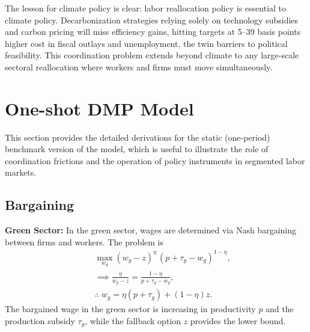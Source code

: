 \documentclass[preprint,12pt]{elsarticle}
\begin{document}
The lesson for climate policy is clear: labor reallocation policy is essential to climate policy. Decarbonization strategies relying solely on technology subsidies and carbon pricing will miss efficiency gains, hitting targets at 5–39 basis points higher cost in fiscal outlays and unemployment, the twin barriers to political feasibility.  This coordination problem extends beyond climate to any large-scale sectoral reallocation where workers and firms must move simultaneously.



\newpage


 

\newpage

\appendix
\renewcommand{\theequation}{A.\arabic{equation}}

\setcounter{equation}{0}

\section{One-shot DMP Model} \label{one-shot}

This section provides the detailed derivations for the static (one-period) benchmark version of the model, which is useful to illustrate the role of coordination frictions and the operation of policy instruments in segmented labor markets.  

\subsection{Bargaining}

\textbf{Green Sector:} In the green sector, wages are determined via Nash bargaining between firms and workers. The problem is
\begin{eqnarray*}
&& \max_{w_g} (w_g - z)^\eta \,(p + \tau_g - w_g)^{1-\eta}, \\
&& \implies \frac{\eta}{w_g - z} = \frac{1-\eta}{p + \tau_g - w_g}, \\
&& \therefore \; w_g = \eta (p + \tau_g) + (1-\eta) z.
\end{eqnarray*}
The bargained wage in the green sector is increasing in productivity \(p\) and the production subsidy \(\tau_g\), while the fallback option \(z\) provides the lower bound.
\end{document}
